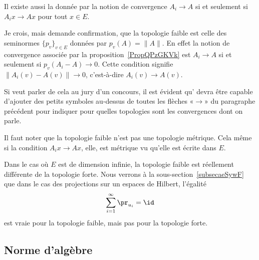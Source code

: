 Il existe aussi la  donnée par la notion de convergence \( A_i\to A\) si et seulement si \( A_ix\to Ax\) pour tout \( x\in E\).

\begin{probleme}
    Je crois, mais demande confirmation, que la topologie faible est celle des seminormes \( \{ p_v \}_{v\in E}\) données par \( p_v(A)=\| A \|\). En effet la notion de convergence associée par la proposition~\ref{PropQPzGKVk} est \( A_i\to A\) si et seulement si \( p_v(A_i-A)\to 0\). Cette condition signifie \( \| A_i(v)-A(v) \|\to 0\), c'est-à-dire \( A_i(v)\to A(v)\).

    Si  veut parler de cela au jury d'un concours, il est évident qu' devra être capable d'ajouter des petits symboles au-dessus de toutes les flèches «\( \to\)» du paragraphe précédent pour indiquer pour quelles topologies sont les convergences dont on parle.
\end{probleme}

\begin{remark}
    Il faut noter que la topologie faible n'est pas une topologie métrique. Cela même si la condition \( A_ix\to Ax\), elle, est métrique vu qu'elle est écrite dans \( E\).

    Dans le cas où \( E\) est de dimension infinie, la topologie faible est réellement différente de la topologie forte. Nous verrons à la sous-section~\ref{subsecaeSywF} que dans le cas des projections sur un espaces de Hilbert, l'égalité
    \begin{equation}
        \sum_{i=1}^{\infty}\pr_{u_i}=\id
    \end{equation}
    est vraie pour la topologie faible, mais pas pour la topologie forte.
\end{remark}

\subsection{Norme d'algèbre}

